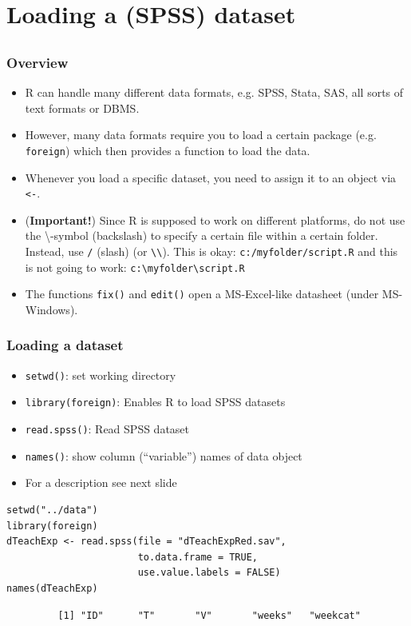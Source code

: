 \documentclass[bigger]{beamer}
\providecommand{\alert}[1]{\textbf{#1}}
\begin{document}
\section{Loading a (SPSS) dataset}
\label{sec-3}
\subsection{}
\begin{frame}
\frametitle{Overview}
\label{sec-3-1-1}

\begin{itemize}
\item R can handle many different data formats, e.g. SPSS, Stata, SAS, all sorts of text formats or DBMS.
\item However, many data formats require you to load a certain package (e.g. \texttt{foreign}) which then provides a function to load the data.
\item Whenever you load a specific dataset, you need to assign it to an object via \texttt{<-}.
\item (\alert{Important!}) Since R is supposed to work on different platforms, do not use the
      \textbackslash-symbol (backslash) to specify a certain file within a certain
      folder. Instead, use \texttt{/} (slash) (or \texttt{\textbackslash{}\textbackslash{}}). This is okay:
      \texttt{c:/myfolder/script.R} and this is not going to work: \texttt{c:\textbackslash{}myfolder\textbackslash{}script.R}
\item The functions \texttt{fix()} and \texttt{edit()} open a MS-Excel-like datasheet (under MS-Windows).
\end{itemize}
\end{frame}
\begin{frame}[fragile,shrink = 15]
\frametitle{Loading a dataset}
\label{sec-3-1-2}

\begin{itemize}
\item \texttt{setwd()}: set working directory
\item \texttt{library(foreign)}: Enables R to load SPSS datasets
\item \texttt{read.spss()}: Read SPSS dataset
\item \texttt{names()}: show column (\enquote{variable}) names of data object
\item For a description see next slide
\end{itemize}


\lstset{language=R}
\begin{lstlisting}
setwd("../data")
library(foreign)
dTeachExp <- read.spss(file = "dTeachExpRed.sav", 
                       to.data.frame = TRUE, 
                       use.value.labels = FALSE)
names(dTeachExp)
\end{lstlisting}

\begin{verbatim}
         [1] "ID"      "T"       "V"       "weeks"   "weekcat"
\end{verbatim}
\end{frame}
\end{document}
